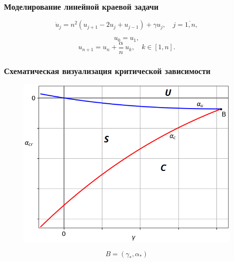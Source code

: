 \documentclass[fullscreen=true, unicode, bookmarks=false]{beamer}
\begin{document}
\begin{frame}
\frametitle{ Моделирование линейной краевой задачи }

\begin{equation}\label{numeric_problem} 
	\dot{u}_j =  n^2(u_{j+1} - 2u_j + u_{j-1}) + \gamma u_j, \quad j = \overline{1, n}, 
\end{equation}

\vfill

$$ u_0 = u_1, $$
$$ u_{n+1} = u_n + \frac{\alpha}{n}\:u_k, \quad k \in [1,n]. $$

\end{frame}

\begin{frame}
\frametitle{ Схематическая визуализация критической зависимости }

\begin{figure} 
\includegraphics[scale=0.55]{scheme.png}  
\end{figure}

$$ B=(\gamma_*, \alpha_*) $$

\end{frame}
\end{document}
